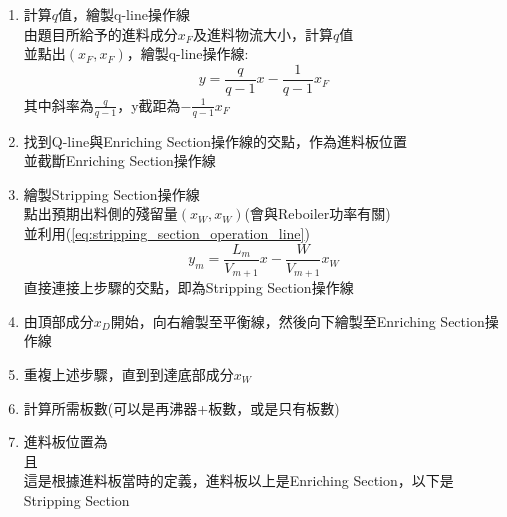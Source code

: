 \documentclass[../main.tex]{subfiles}
\begin{document}
\begin{itemize}
\begin{itemize}
\begin{itemize}
\begin{enumerate}
\begin{equation}
          y = \frac{R}{R+1}x + \frac{1}{R+1}x_D
        \end{equation}
        其中斜率為$\frac{R}{R+1}$，y截距為$\frac{1}{R+1}x_D$
        \item 計算$q$值，繪製q-line操作線\\
        由題目所給予的進料成分$x_F$及進料物流大小，計算$q$值\\
        並點出$(x_F,x_F)$，繪製q-line操作線:
        \begin{equation}
          y = \frac{q}{q-1}x - \frac{1}{q-1}x_F
        \end{equation}
        其中斜率為$\frac{q}{q-1}$，y截距為$-\frac{1}{q-1}x_F$
        \item 找到Q-line與Enriching Section操作線的交點，作為進料板位置\\
        並截斷Enriching Section操作線
        \item 繪製Stripping Section操作線\\
        點出預期出料側的殘留量$(x_W,x_W)$(會與Reboiler功率有關)\\
        並利用(\ref{eq:stripping_section_operation_line})
        \begin{equation}
          y_m = \frac{L_{m}}{V_{m+1}}x - \frac{W}{V_{m+1}}x_W
        \end{equation}
        直接連接上步驟的交點，即為Stripping Section操作線
        \item 由頂部成分$x_D$開始，向右繪製至平衡線，然後向下繪製至Enriching Section操作線
        \item 重複上述步驟，直到到達底部成分$x_W$
        \item 計算所需板數(可以是再沸器+板數，或是只有板數)
        \item 進料板位置為\\
        且\\
        這是根據進料板當時的定義，進料板以上是Enriching Section，以下是Stripping Section
      \end{enumerate}
      \begin{figure}[H]
        \centering
\end{figure}
\end{itemize}
\end{itemize}
\end{itemize}
\end{document}
